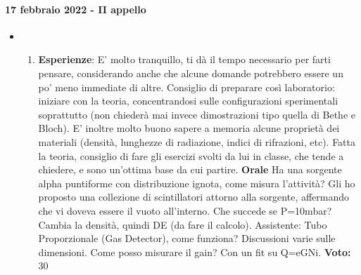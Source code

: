 \documentclass[../main.tex]{subfiles}
\begin{document}
\paragraph{17 febbraio 2022 - II appello}
\begin{itemize}
\item \begin{enumerate}
    \item \textbf{Esperienze}: E' molto tranquillo, ti dà il tempo necessario per farti pensare, considerando anche che alcune domande potrebbero essere un po' meno immediate di altre. Consiglio di preparare così laboratorio: iniziare con la teoria, concentrandosi sulle configurazioni sperimentali soprattutto (non chiederà mai invece dimostrazioni tipo quella di Bethe e Bloch). E' inoltre molto buono sapere a memoria alcune proprietà dei materiali (densità, lunghezze di radiazione, indici di rifrazioni, etc). Fatta la teoria, consiglio di fare gli esercizi svolti da lui in classe, che tende a chiedere, e sono un'ottima base da cui partire.
    \textbf{Orale}
Ha una sorgente alpha puntiforme con distribuzione ignota, come misura l'attività? Gli ho proposto una collezione di scintillatori attorno alla sorgente, affermando che vi doveva essere il vuoto all'interno. Che succede se P=10mbar? Cambia la densità, quindi DE (da fare il calcolo).
Assistente: Tubo Proporzionale (Gas Detector), come funziona? Discussioni varie sulle dimensioni. Come posso misurare il gain? Con un fit su Q=eGNi.
\textbf{Voto:} 30
    \end{enumerate}
\end{itemize}
\end{document}
